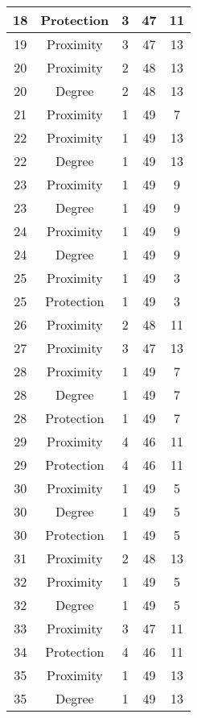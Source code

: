 \documentclass[results.tex]{subfiles}
\begin{document}
\begin{center}
\begin{tabular}{| c || c | c | c | c |}
    \hline
    18 & Protection & 3 & 47 & 11 \\ 
    \hline
    19 & Proximity & 3 & 47 & 13 \\ 
    \hline
    20 & Proximity & 2 & 48 & 13 \\ 
    \hline
    20 & Degree & 2 & 48 & 13 \\ 
    \hline
    21 & Proximity & 1 & 49 & 7 \\ 
    \hline
    22 & Proximity & 1 & 49 & 13 \\ 
    \hline
    22 & Degree & 1 & 49 & 13 \\ 
    \hline
    23 & Proximity & 1 & 49 & 9 \\ 
    \hline
    23 & Degree & 1 & 49 & 9 \\ 
    \hline
    24 & Proximity & 1 & 49 & 9 \\ 
    \hline
    24 & Degree & 1 & 49 & 9 \\ 
    \hline
    25 & Proximity & 1 & 49 & 3 \\ 
    \hline
    25 & Protection & 1 & 49 & 3 \\ 
    \hline
    26 & Proximity & 2 & 48 & 11 \\ 
    \hline
    27 & Proximity & 3 & 47 & 13 \\ 
    \hline
    28 & Proximity & 1 & 49 & 7 \\ 
    \hline
    28 & Degree & 1 & 49 & 7 \\ 
    \hline
    28 & Protection & 1 & 49 & 7 \\ 
    \hline
    29 & Proximity & 4 & 46 & 11 \\ 
    \hline
    29 & Protection & 4 & 46 & 11 \\ 
    \hline
    30 & Proximity & 1 & 49 & 5 \\ 
    \hline
    30 & Degree & 1 & 49 & 5 \\ 
    \hline
    30 & Protection & 1 & 49 & 5 \\ 
    \hline
    31 & Proximity & 2 & 48 & 13 \\ 
    \hline
    32 & Proximity & 1 & 49 & 5 \\ 
    \hline
    32 & Degree & 1 & 49 & 5 \\ 
    \hline
    33 & Proximity & 3 & 47 & 11 \\ 
    \hline
    34 & Protection & 4 & 46 & 11 \\ 
    \hline
    35 & Proximity & 1 & 49 & 13 \\ 
    \hline
    35 & Degree & 1 & 49 & 13 \\ 

\end{tabular}
\end{center}
\end{document}

